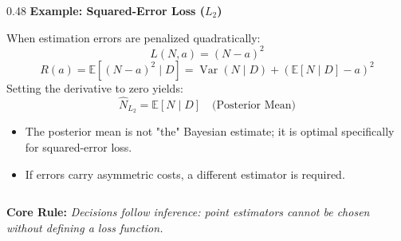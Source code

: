 \documentclass[aspectratio=169,10pt]{beamer}
\begin{document}
\begin{frame}[c]
\begin{columns}[t,onlytextwidth]
    \begin{column}{0.48\textwidth}
      {\small \textbf{\color{accentblue} Example: Squared-Error Loss ($L_2$)}}\\[0.08cm]
      {\scriptsize When estimation errors are penalized quadratically:
      \begin{equation*}
        L(N, a) = (N - a)^2
      \end{equation*}
      \begin{equation*}
        R(a) = \mathbb{E}[(N - a)^2 \mid D] = \operatorname{Var}(N \mid D) + (\mathbb{E}[N \mid D] - a)^2
      \end{equation*}
      Setting the derivative to zero yields:
      \begin{equation*}
        \boxed{\widehat{N}_{L_2} = \mathbb{E}[N \mid D] \quad \text{(Posterior Mean)}}
      \end{equation*}
      \begin{itemize}
        \setlength{\itemsep}{0.06cm}
        \item The posterior mean is not "the" Bayesian estimate; it is optimal specifically for squared-error loss.
        \item If errors carry asymmetric costs, a different estimator is required.
      \end{itemize}}
    \end{column}
  \end{columns}
  
  \vspace{0.25cm}
  \begin{center}
    {\footnotesize \textbf{\color{headernavy} Core Rule: } \textit{Decisions follow inference: point estimators cannot be chosen without defining a loss function.}}
  \end{center}
\end{frame}
\end{document}
